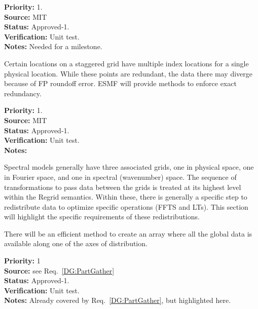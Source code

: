 \begin{reqlist}
{\bf Priority:} 1. \\ 
{\bf Source:} MIT \\
{\bf Status:} Approved-1. \\
{\bf Verification:} Unit test. \\
{\bf Notes:} Needed for a milestone.
\end{reqlist}


Certain locations on a staggered grid have multiple index locations
for a single physical location. While these points are redundant, the
data there may diverge because of FP roundoff error. ESMF will provide
methods to enforce exact redundancy.

\begin{reqlist}
{\bf Priority:} 1. \\ 
{\bf Source:} MIT \\
{\bf Status:} Approved-1. \\
{\bf Verification:} Unit test. \\
{\bf Notes:}
\end{reqlist}


Spectral models generally have three associated grids, one in physical
space, one in Fourier space, and one in spectral (wavenumber) space.
The sequence of transformations to pass data between the grids is
treated at its highest level within the Regrid semantics. Within
these, there is generally a specific step to redistribute data to
optimize specific operations (FFTS and LTs). This section will
highlight the specific requirements of these redistributions.


There will be an efficient method to create an array where all the
global data is available along one of the axes of distribution.

\begin{reqlist}
{\bf Priority:} 1 \\
{\bf Source:} see Req.~\ref{DG:PartGather}\\
{\bf Status:} Approved-1. \\
{\bf Verification:} Unit test. \\
{\bf Notes:} Already covered by Req.~\ref{DG:PartGather}, but
  highlighted here.
\end{reqlist}


